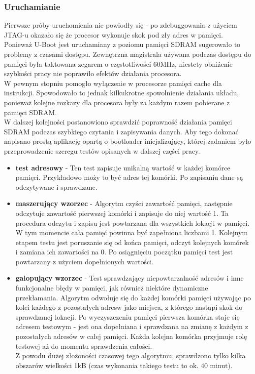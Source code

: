 \documentclass[a4paper,12pt]{book}
\begin{document}
				\subsubsection{Uruchamianie}
				Pierwsze próby uruchomienia nie powiodły się - po zdebuggowania z użyciem JTAG-u okazało się że procesor wykonuje skok pod zły adres w pamięci. Ponieważ U-Boot jest uruchamiany z poziomu pamięci SDRAM sugerowało to problemy z czasami dostępu. Zewnętrzna magistrala używana podczas dostępu do pamięci była taktowana zegarem o częstotliwości 60MHz, niestety obniżenie szybkości pracy nie poprawiło efektów działania procesora.\\
				W pewnym stopniu pomogło wyłączenie w procesorze pamięci cache dla instrukcji. Spowodowało to jednak kilkukrotne spowolnienie działania układu, ponieważ kolejne rozkazy dla procesora były za każdym razem pobierane z pamięci SDRAM.\\
				W dalszej kolejności postanowiono sprawdzić poprawność działania pamięci SDRAM podczas szybkiego czytania i zapisywania danych. Aby tego dokonać napisano prostą aplikację opartą o bootloader inicjalizujący, której zadaniem było przeprowadzenie szeregu testów opisanych w dalszej części pracy.
				\begin{itemize}
 					\item \textbf{test adresowy} - Ten test zapisuje unikalną wartość w każdej komórce pamięci. Przykładowo moży to być adres tej komórki. Po zapisaniu dane są odczytywane i sprawdzane. 
					\item \textbf{maszerujący wzorzec} - Algorytm czyści zawartość pamięci, następnie odczytuje zawartość pierwszej komórki i zapisuje do niej wartość 1. Ta procedura odczytu i zapisu jest powtarzana dla wszystkich lokacji w pamięci. W tym momencie cała pamięć powinna być zapełniona liczbami 1. Kolejnym etapem testu jest poruszanie się od końca pamięci, odczyt kolejnych komórek i zamiana ich zawartości na 0. Po osiągnięciu początku pamięci test jest powtarzany z użyciem dopełnionych wartości.
					\item \textbf{galopujący wzorzec} - Test sprawdzający niepowtarzalność adresów i inne funkcjonalne błędy w pamięci, jak również niektóre dynamiczne przekłamania. Algorytm odwołuje się do każdej komórki pamięci używając po kolei każdego z pozostałych adresw jako miejsca, z którego nastąpi skok do sprawdzanej lokacji. Po wyczyszczeniu pamięci pierwsza komórka staje się adresem testowym - jest ona dopełniana i sprawdzana na zmianę z każdym z pozostałych adresów w całej pamięci. Każda kolejna komórka przyjmuje rolę testowej aż do momentu sprawdzenia całości.\\
					Z powodu dużej złożoności czasowej tego algorytmu, sprawdzono tylko kilka obszarów wielkości 1kB (czas wykonania takiego testu to ok. 40 minut).
				\end{itemize}
\end{document}
